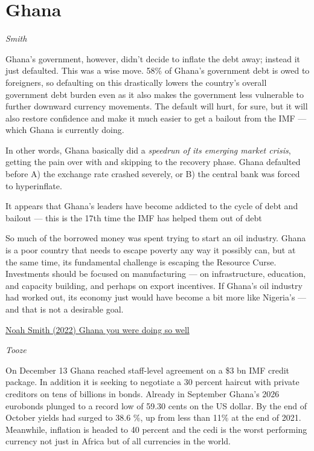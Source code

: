 \documentclass[
]{book}
\begin{document}
\hypertarget{ghana}{%
\section{Ghana}\label{ghana}}

\emph{Smith}

Ghana's government, however, didn't decide to inflate the debt away; instead it just defaulted. This was a wise move. 58\% of Ghana's government debt is owed to foreigners, so defaulting on this drastically lowers the country's overall government debt burden even as it also makes the government less vulnerable to further downward currency movements. The default will hurt, for sure, but it will also restore confidence and make it much easier to get a bailout from the IMF --- which Ghana is currently doing.

In other words, Ghana basically did a \emph{speedrun of its emerging market crisis}, getting the pain over with and skipping to the recovery phase. Ghana defaulted before A) the exchange rate crashed severely, or B) the central bank was forced to hyperinflate.

It appears that Ghana's leaders have become addicted to the cycle of debt and bailout --- this is the 17th time the IMF has helped them out of debt

So much of the borrowed money was spent trying to start an oil industry.
Ghana is a poor country that needs to escape poverty any way it possibly can, but at the same time, its fundamental challenge is escaping the Resource Curse. Investments should be focused on manufacturing --- on infrastructure, education, and capacity building, and perhaps on export incentives. If Ghana's oil industry had worked out, its economy just would have become a bit more like Nigeria's --- and that is not a desirable goal.

\href{https://noahpinion.substack.com/p/ghana-you-were-doing-so-well}{Noah Smith (2022) Ghana you were doing so well}

\emph{Tooze}

On December 13 Ghana reached staff-level agreement on a \$3 bn IMF credit package. In addition it is seeking to negotiate a 30 percent haircut with private creditors on tens of billions in bonds. Already in September Ghana's 2026 eurobonds plunged to a record low of 59.30 cents on the US dollar. By the end of October yields had surged to 38.6 \%, up from less than 11\% at the end of 2021. Meanwhile, inflation is headed to 40 percent and the cedi is the worst performing currency not just in Africa but of all currencies in the world.
\end{document}
